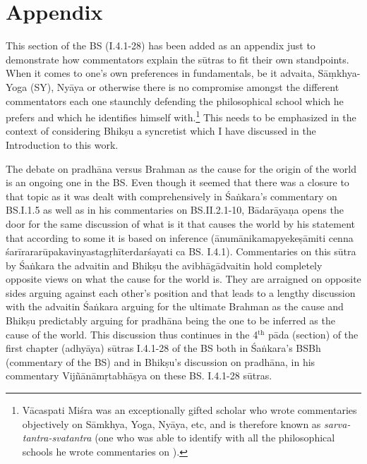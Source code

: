 \chapter*{Appendix}\label{appendix}
\setcounter{footnote}{0}

This section of the BS (I.4.1-28) has been added as an appendix just to demonstrate how commentators explain the sūtras to fit their own standpoints. When it comes to one’s own preferences in fundamentals, be it advaita, Sāṃkhya- Yoga (SY), Nyāya or otherwise there is no compromise amongst the different commentators each one staunchly defending the philosophical school which he prefers and which he identifies himself with.\footnote{Vācaspati Miśra was an exceptionally gifted scholar who wrote commentaries objectively on Sāmkhya, Yoga, Nyāya,  etc, and is therefore known as \textit{sarva-tantra-svatantra} (one  who was able to identify with all  the philosophical schools he wrote commentaries on ). } This needs to be emphasized in the context of considering Bhikṣu a syncretist which I have discussed in the Introduction to this work. 

The debate on pradhāna versus Brahman as the cause for the origin of the world is an ongoing one in the BS. Even though it seemed that there was a closure to that topic as it was dealt with comprehensively in  Śaṅkara’s commentary on BS.I.1.5 as well as in his commentaries on BS.II.2.1-10,  Bādarāyaṇa opens the door for the same discussion of what is it that causes the world  by his statement that according to some it is based on inference (ānumānikamapyekeṣāmiti cenna śarīrararūpakavinyastagṛhīterdarśayati ca BS. I.4.1). Commentaries on this sūtra by Śaṅkara the advaitin and Bhikṣu the avibhāgādvaitin hold completely opposite views on what the cause for the world is. They are arraigned on opposite sides arguing against each other’s position and that  leads to a lengthy discussion with the advaitin Śaṅkara arguing for the ultimate Brahman as the cause and Bhikṣu predictably arguing for pradhāna being the one to be inferred as the cause of the world. This discussion thus continues in the 4$^{\text{th}}$ pāda (section) of the first chapter (adhyāya) sūtras I.4.1-28 of the BS both in Śaṅkara’s BSBh (commentary of the BS) and in Bhikṣu’s discussion on pradhāna, in his commentary Vijñānāmṛtabhāṣya on these BS. I.4.1-28 sūtras. 

